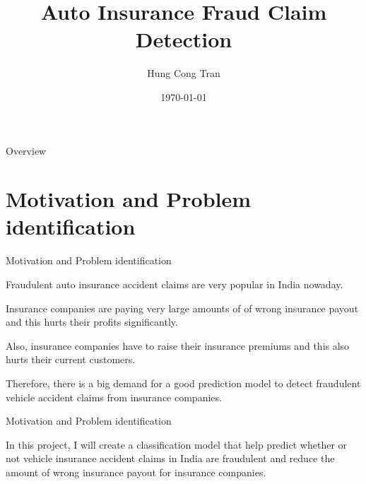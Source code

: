 \documentclass[aspectratio=169,xcolor=dvipsnames]{beamer}
\title[]{Auto Insurance Fraud Claim Detection}
\subtitle{}
\author[Hung Tran] {Hung Cong Tran}
\date{\today} %
\begin{document}
\begin{frame}
    \titlepage
\end{frame}

\begin{frame}{Overview}
    \tableofcontents
\end{frame}

\section{Motivation and Problem identification}

\begin{frame}{Motivation and Problem identification}

Fraudulent auto insurance accident claims are very popular in India nowaday. 
\vspace{0.2in}

Insurance companies are  paying very large amounts of of wrong insurance payout and this hurts their profits significantly. 

\vspace{0.2in}

Also, insurance companies have to raise their insurance premiums and this also hurts their current customers.  

\vspace{0.2in}
Therefore, there is a big demand for a good prediction model to detect fraudulent vehicle accident claims from insurance companies.

\end{frame}

\begin{frame}{Motivation and Problem identification}

In this project, I will create a classification model that help predict whether or not vehicle insurance accident claims in India are fraudulent and reduce the amount of wrong insurance payout for insurance companies.
    
\end{frame}
\end{document}
